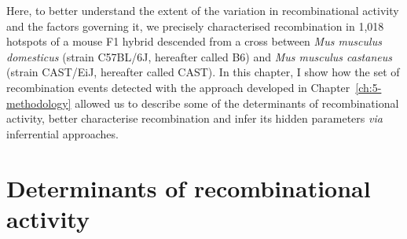 %

Here, to better understand the extent of the variation in recombinational activity and the factors governing it, we precisely characterised recombination in 1,018 hotspots of a mouse F1 hybrid descended from a cross between \textit{Mus musculus domesticus} (strain C57BL/6J, hereafter called B6) and \textit{Mus musculus castaneus} (strain CAST/EiJ, hereafter called CAST).
In this chapter, I show how the set of recombination events detected with the approach developed in Chapter~\ref{ch:5-methodology} allowed us to describe some of the determinants of recombinational activity, better characterise recombination and infer its hidden parameters \textit{via} inferrential approaches.
%




\section{Determinants of recombinational activity}

